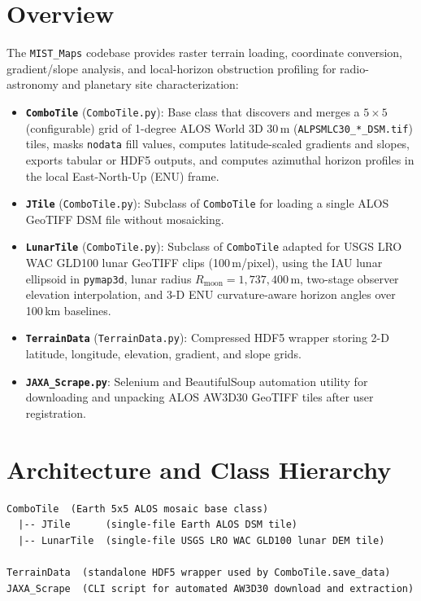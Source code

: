 \documentclass[11pt,letterpaper]{article}
\begin{document}
\section{Overview}
The \texttt{MIST\_Maps} codebase provides raster terrain loading, coordinate conversion, gradient/slope analysis, and local-horizon obstruction profiling for radio-astronomy and planetary site characterization:
\begin{itemize}
  \item \textbf{\texttt{ComboTile}} (\texttt{ComboTile.py}): Base class that discovers and merges a $5\times 5$ (configurable) grid of 1-degree ALOS World 3D 30\,m (\texttt{ALPSMLC30\_*\_DSM.tif}) tiles, masks \texttt{nodata} fill values, computes latitude-scaled gradients and slopes, exports tabular or HDF5 outputs, and computes azimuthal horizon profiles in the local East-North-Up (ENU) frame.
  \item \textbf{\texttt{JTile}} (\texttt{ComboTile.py}): Subclass of \texttt{ComboTile} for loading a single ALOS GeoTIFF DSM file without mosaicking.
  \item \textbf{\texttt{LunarTile}} (\texttt{ComboTile.py}): Subclass of \texttt{ComboTile} adapted for USGS LRO WAC GLD100 lunar GeoTIFF clips (100\,m/pixel), using the IAU lunar ellipsoid in \texttt{pymap3d}, lunar radius $R_{\text{moon}} = 1{,}737{,}400\,\text{m}$, two-stage observer elevation interpolation, and 3-D ENU curvature-aware horizon angles over 100\,km baselines.
  \item \textbf{\texttt{TerrainData}} (\texttt{TerrainData.py}): Compressed HDF5 wrapper storing 2-D latitude, longitude, elevation, gradient, and slope grids.
  \item \textbf{\texttt{JAXA\_Scrape.py}}: Selenium and BeautifulSoup automation utility for downloading and unpacking ALOS AW3D30 GeoTIFF tiles after user registration.
\end{itemize}

\section{Architecture and Class Hierarchy}
\begin{verbatim}
ComboTile  (Earth 5x5 ALOS mosaic base class)
  |-- JTile      (single-file Earth ALOS DSM tile)
  |-- LunarTile  (single-file USGS LRO WAC GLD100 lunar DEM tile)

TerrainData  (standalone HDF5 wrapper used by ComboTile.save_data)
JAXA_Scrape  (CLI script for automated AW3D30 download and extraction)
\end{verbatim}
\end{document}
